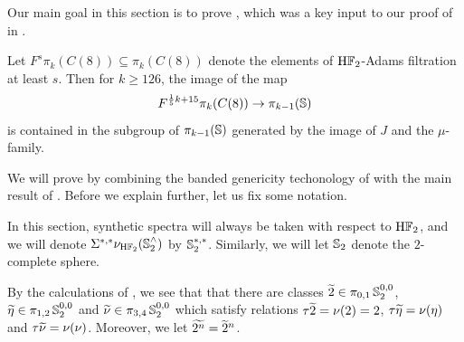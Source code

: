 Our main goal in this section is to prove , which was a key input to our proof of  in .

\begin{thm}\label{thm:mod8-main-thm}
    Let $F^s \pi_k (C(8)) \subseteq \pi_k (C(8))$ denote the elements of $\mathrm{H}\mathbb{F}_2$-Adams filtration at least $s$. Then for $k \geq 126$, the image of the map \[F^{\frac{1}{5} k + 15} \pi_k (C(8)) \to \pi_{k-1} (\operatorname{\mathbb{S}})\] is contained in the subgroup of $\pi_{k-1} (\operatorname{\mathbb{S}})$ generated by the image of $J$ and the $\mu$-family.

\end{thm}

We will prove  by combining the banded genericity techonology of  with the main result of . Before we explain further, let us fix some notation.

\begin{cnv}
    In this section, synthetic spectra will always be taken with respect to $\mathrm{H}\mathbb{F}_2$, and we will denote $\Sigma^{*,*}\nu_{\mathrm{H}\mathbb{F}_2}( \operatorname{\mathbb{S}}_2^\wedge )$ by $\operatorname{\mathbb{S}}_2^{*,*}$. Similarly, we will let $\operatorname{\mathbb{S}}_2$ denote the $2$-complete sphere.
\end{cnv}


\begin{ntn}
By the calculations of , we see that that there are classes $\wt{2} \in \pi_{0,1} \Ss_2^{0,0}$, $\wt{\eta} \in \pi_{1,2} \Ss_2^{0,0}$ and $\wt{\nu} \in \pi_{3,4} \Ss_2^{0,0}$ which satisfy relations $\tau \wt{2} = \nu (2) = 2$, $\tau \wt{\eta} = \nu (\eta)$ and $\tau \wt{\nu} = \nu (\nu)$. Moreover, we let $\wt{2^n} = \wt{2}^n$.
\end{ntn}

